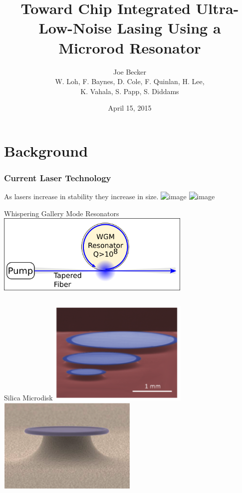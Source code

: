 \documentclass{beamer}
\title[Microrod Lasing]{Toward Chip Integrated Ultra-Low-Noise Lasing Using a Microrod Resonator} %
\author[J. Becker]{Joe Becker \\
\scriptsize{W. Loh, F. Baynes, D. Cole, F. Quinlan, H. Lee,\\
K. Vahala, S. Papp, S. Diddams}} %
\institute[NIST] %
{
National Institute of Standards and Technology\\ %
\medskip
\textit{Joe.Becker@nist.gov} %
}
\date{April 15, 2015} %
\begin{document}
\begin{frame}
\titlepage %
\end{frame}


\section{Background} 
\begin{frame}\frametitle{Current Laser Technology}
As lasers increase in stability they increase in size.
\includegraphics<1>[width=0.95\textwidth]{Images/Current_Laser1.png}
\includegraphics<2>[width=0.95\textwidth]{Images/Current_Laser2.png}
\end{frame}

\begin{frame}{Whispering Gallery Mode Resonators}
\centering
\includegraphics[width=0.7\textwidth]{Images/WGM_Resonator_Fig.png}
\begin{columns}

\begin{block}{Silica Microdisk}
\includegraphics[width=0.5\textwidth]{Images/Wedge_Microdisk.png}
\includegraphics[width=0.5\textwidth]{Images/Microtoroid.png}


\end{block}
\end{columns}
\end{frame}
\end{document}
